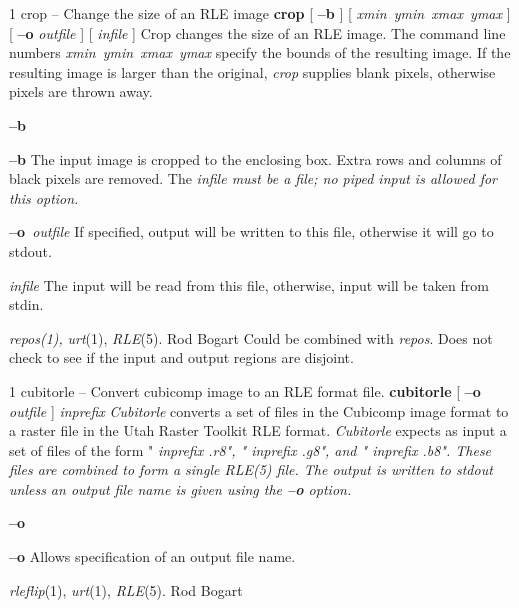 %
%
%
 1
crop -- Change the size of an RLE image
{\bf crop} 
[
{\bf --b}
] [
{\it xmin\ ymin\ xmax\ ymax}
]
[
{\bf --o}
{\it outfile}
] [ 
{\it infile} 
] 
{\it }
Crop changes the size of an RLE image.  The command line numbers
{\it xmin\ ymin\ xmax\ ymax}
specify the bounds of the resulting image.  If the resulting image is larger 
than the original, 
{\it crop}
supplies blank pixels, otherwise pixels are thrown away.
\begin{TPlist}{{\bf --b}}
\item[{{\bf --b}}]
The input image is cropped to the enclosing box.  Extra rows and columns of 
black pixels are removed.  The %
\it infile %
\rm must be a file; no piped input is
allowed for this option.
\item[{{\bf --o}{\it \ outfile}
}]
If specified, output will be written to this file, otherwise it will
go to stdout.
\item[{{\it infile}}]
The input will be read from this file, otherwise, input will
be taken from stdin.
\end{TPlist}
{\it repos(1),}
{\it urt}{\rm (1),}
{\it RLE}{\rm (5).}
Rod Bogart
Could be combined with 
{\it repos}{\rm .}
Does not check to see if the input and output regions are disjoint.


\newpage


%
%
%
 1
cubitorle -- Convert cubicomp image to an RLE format file.
{\bf cubitorle}
[
{\bf --o} 
{\it outfile}
] 
{\it inprefix}
{\it Cubitorle}
converts a set of files in the Cubicomp image format to a raster file in the 
Utah Raster Toolkit RLE format.
{\it Cubitorle}
expects as input a set of files of the form "%
\it inprefix%
\rm .r8", 
"%
\it inprefix%
\rm .g8", and "%
\it inprefix%
\rm .b8".  These files are combined
to form a single 
{\it RLE}{\rm (5)}
file.
The output is written to
{\it stdout}
unless an output file name is given using the
{\bf --o}
option.
\begin{TPlist}{{\bf --o}
}
\item[{{\bf --o}
}]
Allows specification of an output file name.
\end{TPlist}
{\it rleflip}{\rm (1),}
{\it urt}{\rm (1),}
{\it RLE}{\rm (5).}
Rod Bogart
\newpage


